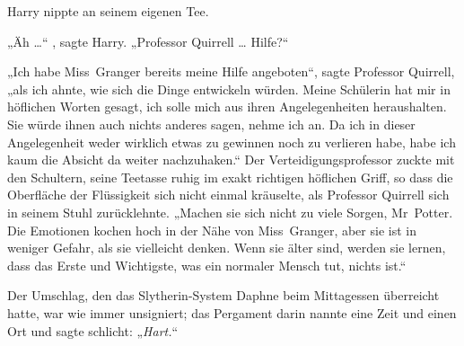 Harry nippte an seinem eigenen Tee.

„Äh …“ , sagte Harry.
„Professor Quirrell … Hilfe?“

„Ich habe Miss~Granger bereits meine Hilfe angeboten“, sagte Professor Quirrell, „als ich ahnte, wie sich die Dinge entwickeln würden. Meine Schülerin hat mir in höflichen Worten gesagt, ich solle mich aus ihren Angelegenheiten heraushalten. Sie würde ihnen auch nichts anderes sagen, nehme ich an. Da ich in dieser Angelegenheit weder wirklich etwas zu gewinnen noch zu verlieren habe, habe ich kaum die Absicht da weiter nachzuhaken.“ Der Verteidigungsprofessor zuckte mit den Schultern, seine Teetasse ruhig im exakt richtigen höflichen Griff, so dass die Oberfläche der Flüssigkeit sich nicht einmal kräuselte, als Professor Quirrell sich in seinem Stuhl zurücklehnte.
„Machen sie sich nicht zu viele Sorgen, Mr~Potter. Die Emotionen kochen hoch in der Nähe von Miss~Granger, aber sie ist in weniger Gefahr, als sie vielleicht denken. Wenn sie älter sind, werden sie lernen, dass das Erste und Wichtigste, was ein normaler Mensch tut, nichts ist.“

\later

Der Umschlag, den das Slytherin-System Daphne beim Mittagessen überreicht hatte, war wie immer unsigniert; das Pergament darin nannte eine Zeit und einen Ort und sagte schlicht:
„\emph{Hart.}“

